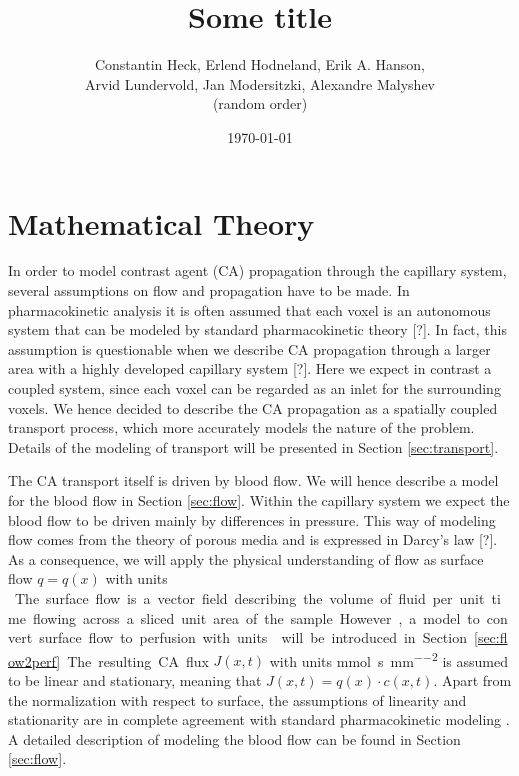 \documentclass[paper=a4, fontsize=12pt,parskip=half,draft,headings=small]{scrartcl}
\title{Some title}
\author{Constantin Heck, Erlend Hodneland, Erik A. Hanson, \\ Arvid Lundervold, Jan Modersitzki, Alexandre Malyshev \\ (random order)}
\date{\today}
\begin{document}


	\section{Mathematical Theory} \label{sec:maththeory}
	
	In order to model contrast agent (CA) propagation through the capillary system, several assumptions on flow and propagation have to be made.
	In pharmacokinetic analysis it is often assumed that each voxel is an autonomous system that can be modeled by standard pharmacokinetic theory [?].
	In fact, this assumption is questionable when we describe CA propagation through a larger area with a highly developed capillary system [?].
	Here we expect in contrast a coupled system, since each voxel can be regarded as an inlet for the surrounding voxels.
	We hence decided to describe the CA propagation as a spatially coupled transport process, which more accurately models the nature of the problem. 
	Details of the modeling of transport will be presented in Section \ref{sec:transport}.
	
	The CA transport itself is driven by blood flow. 
	We will hence describe a model for the blood flow in Section \ref{sec:flow}.
	Within the capillary system we expect the blood flow to be driven mainly by differences in pressure.
	This way of modeling flow comes from the theory of porous media and is expressed in Darcy's law [?].
	As a consequence, we will apply the physical understanding of flow as surface flow $q = q(x)$ with units \si{\cubic\cubic\milli\meter\per\second\per\square\milli\meter}.
	The surface flow is a vector field describing the volume of fluid per unit time flowing across a sliced unit area of the sample.	
	However, a model to convert surface flow to perfusion with units \si{\cubic\cubic\milli\meter\per\second\per\cubic\milli\meter} will be introduced in Section \ref{sec:flow2perf}.
	The resulting CA flux $J(x,t)$ with units \si{\milli\mol\per\second\per\square\milli\meter} is assumed to be linear and stationary, meaning that $J(x,t) = q(x)\cdot c(x,t)$.
	Apart from the normalization with respect to surface, the assumptions of linearity and stationarity are in complete agreement with standard pharmacokinetic modeling \cite{sourbron13}.
	A detailed description of modeling the blood flow can be found in Section \ref{sec:flow}.
	
\end{document}
